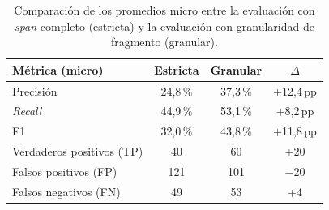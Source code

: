 \begin{table}[htbp]
    \centering
    \caption{Comparación de los promedios micro entre la evaluación con \textit{span} completo
    (estricta) y la evaluación con granularidad de fragmento (granular).}
    \label{tab:ner_comparacion}
    \begin{tabular}{@{}lccc@{}}
    \toprule
    \textbf{Métrica (micro)} & \textbf{Estricta} & \textbf{Granular} & \textbf{$\Delta$} \\
    \midrule
    Precisión & 24,8\,\% & 37,3\,\% & +12,4\,pp \\
    \textit{Recall} & 44,9\,\% & 53,1\,\% & +8,2\,pp \\
    F1 & 32,0\,\% & 43,8\,\% & +11,8\,pp \\
    Verdaderos positivos (TP) & 40 & 60 & +20 \\
    Falsos positivos (FP) & 121 & 101 & $-$20 \\
    Falsos negativos (FN) & 49 & 53 & +4 \\
    \bottomrule
    \end{tabular}
\end{table}
